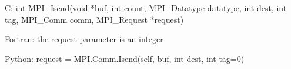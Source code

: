 C:
int MPI_Isend(void *buf,
  int count, MPI_Datatype datatype, int dest, int tag,
  MPI_Comm comm, MPI_Request *request)

Fortran:
the request parameter is an integer
  
Python:
request = MPI.Comm.Isend(self, buf, int dest, int tag=0)
